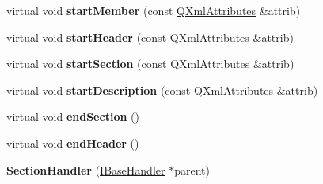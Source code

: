 \begin{DoxyCompactItemize}
\item 
\hypertarget{class_section_handler_a01468590a99c462fcde01bef28afdadf}{virtual void {\bfseries start\-Member} (const \hyperlink{class_q_xml_attributes}{Q\-Xml\-Attributes} \&attrib)}\label{class_section_handler_a01468590a99c462fcde01bef28afdadf}

\item 
\hypertarget{class_section_handler_a93f56ad69289566147fd4287e3aacce6}{virtual void {\bfseries start\-Header} (const \hyperlink{class_q_xml_attributes}{Q\-Xml\-Attributes} \&attrib)}\label{class_section_handler_a93f56ad69289566147fd4287e3aacce6}

\item 
\hypertarget{class_section_handler_a61cef5a9912b15e7535cdffe96b75ba0}{virtual void {\bfseries start\-Section} (const \hyperlink{class_q_xml_attributes}{Q\-Xml\-Attributes} \&attrib)}\label{class_section_handler_a61cef5a9912b15e7535cdffe96b75ba0}

\item 
\hypertarget{class_section_handler_abe39ebb5380ca692b19b72c9ab52210e}{virtual void {\bfseries start\-Description} (const \hyperlink{class_q_xml_attributes}{Q\-Xml\-Attributes} \&attrib)}\label{class_section_handler_abe39ebb5380ca692b19b72c9ab52210e}

\item 
\hypertarget{class_section_handler_ace4c245882d2df48abd462570ca940d9}{virtual void {\bfseries end\-Section} ()}\label{class_section_handler_ace4c245882d2df48abd462570ca940d9}

\item 
\hypertarget{class_section_handler_a7a7d4da6d81c6b2da22a678a5d883ed9}{virtual void {\bfseries end\-Header} ()}\label{class_section_handler_a7a7d4da6d81c6b2da22a678a5d883ed9}

\item 
\hypertarget{class_section_handler_a7d0768f426c4cb84a2e16eb19120d1bc}{{\bfseries Section\-Handler} (\hyperlink{class_i_base_handler}{I\-Base\-Handler} $\ast$parent)}\label{class_section_handler_a7d0768f426c4cb84a2e16eb19120d1bc}


\end{DoxyCompactItemize}
